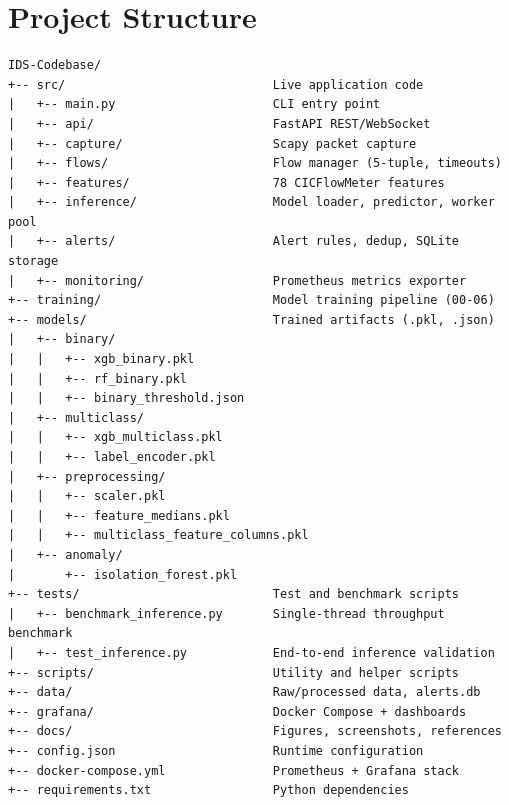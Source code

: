 \documentclass[12pt,a4paper]{article}
\begin{document}
\section{Project Structure}
\begin{lstlisting}[basicstyle=\ttfamily\footnotesize, numbers=none]
IDS-Codebase/
+-- src/                             Live application code
|   +-- main.py                      CLI entry point
|   +-- api/                         FastAPI REST/WebSocket
|   +-- capture/                     Scapy packet capture
|   +-- flows/                       Flow manager (5-tuple, timeouts)
|   +-- features/                    78 CICFlowMeter features
|   +-- inference/                   Model loader, predictor, worker pool
|   +-- alerts/                      Alert rules, dedup, SQLite storage
|   +-- monitoring/                  Prometheus metrics exporter
+-- training/                        Model training pipeline (00-06)
+-- models/                          Trained artifacts (.pkl, .json)
|   +-- binary/
|   |   +-- xgb_binary.pkl
|   |   +-- rf_binary.pkl
|   |   +-- binary_threshold.json
|   +-- multiclass/
|   |   +-- xgb_multiclass.pkl
|   |   +-- label_encoder.pkl
|   +-- preprocessing/
|   |   +-- scaler.pkl
|   |   +-- feature_medians.pkl
|   |   +-- multiclass_feature_columns.pkl
|   +-- anomaly/
|       +-- isolation_forest.pkl
+-- tests/                           Test and benchmark scripts
|   +-- benchmark_inference.py       Single-thread throughput benchmark
|   +-- test_inference.py            End-to-end inference validation
+-- scripts/                         Utility and helper scripts
+-- data/                            Raw/processed data, alerts.db
+-- grafana/                         Docker Compose + dashboards
+-- docs/                            Figures, screenshots, references
+-- config.json                      Runtime configuration
+-- docker-compose.yml               Prometheus + Grafana stack
+-- requirements.txt                 Python dependencies
\end{lstlisting}
\end{document}
